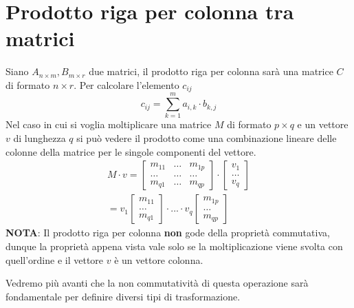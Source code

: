 \section{Prodotto riga per colonna tra matrici}
Siano $A_{n \times m}, B_{m \times r}$ due matrici, il prodotto riga per colonna
sar\`a una matrice $C$ di formato $n \times r$. Per calcolare l'elemento $c_{ij}$
\[ c_{ij} = \sum_{k = 1}^m a_{i,k} \cdot b_{k,j} \]
Nel caso in cui si voglia moltiplicare una matrice $M$ di formato $p \times q$ e un
vettore $v$ di lunghezza $q$ si pu\`o vedere il prodotto come una combinazione lineare
delle colonne della matrice per le singole componenti del vettore.
\begin{gather*}
	M \cdot v =
	\begin{bmatrix}
		m_{11} & \dots & m_{1p} \\
		\dots  & \dots & \dots  \\
		m_{q1} & \dots & m_{qp}
	\end{bmatrix} \cdot
	\begin{bmatrix}
		v_1 \\ \dots \\ v_q
	\end{bmatrix} \\
	= v_1 \begin{bmatrix}
		m_{11} \\ \dots \\ m_{q1}
	\end{bmatrix} \cdot
	... \cdot
	v_q \begin{bmatrix}
		m_{1p} \\ \dots \\ m_{qp}
	\end{bmatrix}
\end{gather*}
\textbf{NOTA}: Il prodotto riga per colonna \textbf{non} gode della propriet\`a
commutativa, dunque la propriet\`a appena vista vale solo se la moltiplicazione viene
svolta con quell'ordine e il vettore $v$ \`e un vettore colonna.

Vedremo pi\`u avanti che la non commutativit\`a di questa operazione sar\`a fondamentale
per definire diversi tipi di trasformazione.